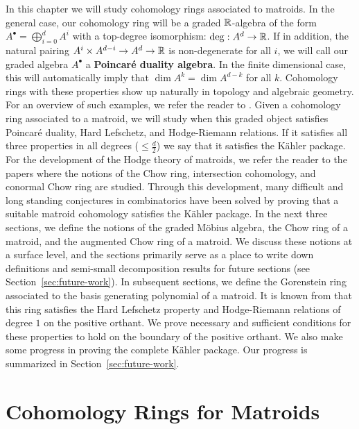\documentclass{puthesis-UG}
\begin{document}
In this chapter we will study cohomology rings associated to matroids. In the general case, our cohomology ring will be a graded $\mathbb{R}$-algebra of the form $A^\bullet = \bigoplus_{i = 0}^d A^i$ with a top-degree isomorphism: $\deg : A^d \to \mathbb{R}$. If in addition, the natural pairing $A^i \times A^{d-i} \to A^d \to \mathbb{R}$ is non-degenerate for all $i$, we will call our graded algebra $A^\bullet$ a \textbf{Poincar\'e duality algebra}. In the finite dimensional case, this will automatically imply that $\dim A^k = \dim A^{d-k}$ for all $k$. Cohomology rings with these properties show up naturally in topology and algebraic geometry. For an overview of such examples, we refer the reader to \cite{Huh2016TropicalGO}. Given a cohomology ring associated to a matroid, we will study when this graded object satisfies Poincar\'e duality, Hard Lefschetz, and Hodge-Riemann relations. If it satisfies all three properties in all degrees ($\leq \frac{d}{2}$) we say that it satisfies the K\"ahler package. For the development of the Hodge theory of matroids, we refer the reader to the papers \cite{AHK,huh-semi-small,ardila2022lagrangian,eur2022stellahedral,Feichtner_2004} where the notions of the Chow ring, intersection cohomology, and conormal Chow ring are studied. Through this development, many difficult and long standing conjectures in combinatorics have been solved by proving that a suitable matroid cohomology satisfies the K\"ahler package. In the next three sections, we define the notions of the graded M\"obius algebra, the Chow ring of a matroid, and the augmented Chow ring of a matroid. We discuss these notions at a surface level, and the sections primarily serve as a place to write down definitions and semi-small decomposition results for future sections (see Section~\ref{sec:future-work}). In subsequent sections, we define the Gorenstein ring associated to the basis generating polynomial of a matroid. It is known from \cite{MNY} that this ring satisfies the Hard Lefschetz property and Hodge-Riemann relations of degree $1$ on the positive orthant. We prove necessary and sufficient conditions for these properties to hold on the boundary of the positive orthant. We also make some progress in proving the complete K\"ahler package. Our progress is summarized in Section~\ref{sec:future-work}.

\section{Cohomology Rings for Matroids} \label{sec:cohomology-rings-for-matroids}
	
\end{document}
